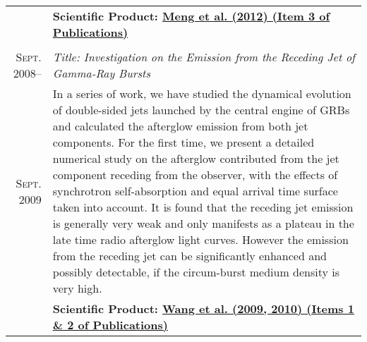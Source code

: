 \documentclass[10pt]{article}
\begin{document}
\begin{longtable}{r|p{17cm}}
                           &   \textbf{Scientific Product: \hyperlink{12.meng.apj}{Meng et al. (2012) (Item 3 of Publications)}} \\
  \multicolumn{2}{c}{} \\
  \textsc{Sept. 2008}--     &   \emph{Title: Investigation on the Emission from the Receding Jet of Gamma-Ray Bursts}   \\
  \textsc{Sept. 2009}       &   \small{In a series of work, we have studied the dynamical evolution of double-sided jets launched by the central engine of GRBs and calculated the afterglow emission from both jet components. For the first time, we present a detailed numerical study on the afterglow contributed from the jet component receding from the observer, with the effects of synchrotron self-absorption and equal arrival time surface taken into account. It is found that the receding jet emission is generally very weak and only manifests as a plateau in the late time radio afterglow light curves. However the emission from the receding jet can be significantly enhanced and possibly detectable, if the circum-burst medium density is very high.} \\
                           &   \textbf{Scientific Product: \hyperlink{09.wang.aa}{Wang et al. (2009, 2010) (Items 1 \& 2 of Publications)}} \\
\end{longtable}


\end{document}
